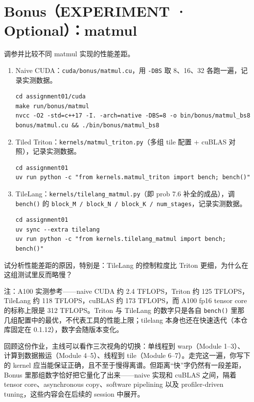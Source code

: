 \documentclass[11pt,a4paper,fontset=windows]{ctexart}
\begin{document}
\clearpage
\section*{Bonus（EXPERIMENT · Optional）：matmul}

调参并比较不同 matmul 实现的性能差距。

\begin{enumerate}[label=(\alph*)]
  \item Naive CUDA：\texttt{cuda/bonus/matmul.cu}，用 \texttt{-DBS} 取 8、16、32 各跑一遍，记录实测数据。
\begin{lstlisting}
cd assignment01/cuda
make run/bonus/matmul
nvcc -O2 -std=c++17 -I. -arch=native -DBS=8 -o bin/bonus/matmul_bs8 bonus/matmul.cu && ./bin/bonus/matmul_bs8
\end{lstlisting}
  \item Tiled Triton：\texttt{kernels/matmul\_triton.py}（多组 tile 配置 + cuBLAS 对照），记录实测数据。
\begin{lstlisting}
cd assignment01
uv run python -c "from kernels.matmul_triton import bench; bench()"
\end{lstlisting}
  \item TileLang：\texttt{kernels/tilelang\_matmul.py}（即 prob 7.6 补全的成品），调 \texttt{bench()} 的 \texttt{block\_M / block\_N / block\_K / num\_stages}，记录实测数据。
\begin{lstlisting}
cd assignment01
uv sync --extra tilelang
uv run python -c "from kernels.tilelang_matmul import bench; bench()"
\end{lstlisting}
\end{enumerate}

试分析性能差距的原因，特别是：TileLang 的控制粒度比 Triton 更细，为什么在这组测试里反而略慢？

注：A100 实测参考——naive CUDA 约 2.4 TFLOPS，Triton 约 125 TFLOPS，TileLang 约 118 TFLOPS，cuBLAS 约 173 TFLOPS，而 A100 fp16 tensor core 的标称上限是 312 TFLOPS。Triton 与 TileLang 的数字只是各自 \texttt{bench()} 里那几组配置中的最优，不代表工具的性能上限；tilelang 本身也还在快速迭代（本仓库固定在 0.1.12），数字会随版本变化。
\begin{lookback}
回顾这份作业，主线可以看作三次视角的切换：单线程到 warp（Module 1--3）、计算到数据搬运（Module 4--5）、线程到 tile（Module 6--7）。走完这一遍，你写下的 kernel 应当能保证正确，且不至于慢得离谱。但距离“快”字仍然有一段差距，Bonus 里那组数字恰好把它量化了出来——naive 实现和 cuBLAS 之间，隔着 tensor core、asynchronous copy、software pipelining 以及 profiler-driven tuning，这些内容会在后续的 session 中展开。
\end{lookback}
\end{document}
